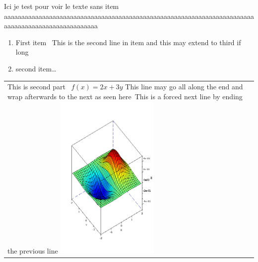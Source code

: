 \documentclass{article}
\begin{document}
Ici je test pour voir le texte sans item aaaaaaaaaaaaaaaaaaaaaaaaaaaaaaaaaaaaaaaaaaaaaaaaaaaaaaaaaaaaaaaaaaaaaaaaaaaaaaaaaaaaaaaaaaaaaaaaaaa
\begin{minipage}{0.45\textwidth}
\begin{enumerate}
  \item First item \            This is the second line in item and this may extend to third if long
  \item second item\ldots
\end{enumerate}
\end{minipage}%
\hfill
\begin{minipage}{0.45\textwidth}
\begin{tabular}{|p{\textwidth}}
{\small This is second part \    $f(x) = 2x + 3y$ This line may go all along the end and wrap afterwards to the next as seen here\    This is a forced next line by ending the previous line }
%
\includegraphics[width=50mm]{Surf.png}
\end{tabular}
\end{minipage}%
\end{document}
